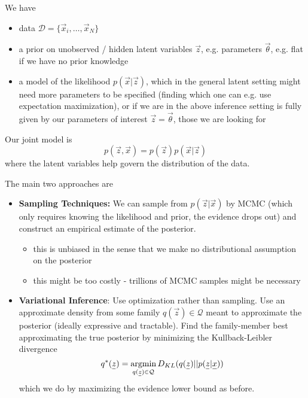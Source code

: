 We have
\begin{itemize}
    \item data $\mathcal{D} = \{ \vec{x}_i, \dots, \vec{x}_N \}$
    \item a prior on unobserved / hidden latent variables $\vec{z}$, e.g. parameters $\vec{\theta}$, e.g. flat if we have no prior knowledge
    \item a model of the likelihood $p(\vec{x}|\vec{z})$, which in the general latent setting might need more parameters
    to be specified (finding which one can e.g. use expectation maximization), or if we are in the above inference setting
    is fully given by our parameters of interest $\vec{z} = \vec{\theta}$, those we are looking for
\end{itemize}

Our joint model is
\begin{equation}
    p(\vec{z},\vec{x}) = p(\vec{z}) p(\vec{x}|\vec{z})
\end{equation}
where the latent variables help govern the distribution of the data.


The main two approaches are
\begin{itemize}
    \item \textbf{Sampling Techniques:} We can sample from $p(\vec{z}|\vec{x})$ by MCMC (which only requires knowing the
    likelihood and prior, the evidence drops out) and construct an empirical estimate of the posterior.
    \begin{itemize}
        \item \textcolor{green1}{this is unbiased in the sense that we make no distributional assumption on the posterior}
        \item \textcolor{red1}{this might be too costly - trillions of MCMC samples might be necessary}
    \end{itemize}
    \item \textbf{Variational Inference}: Use optimization rather than sampling. Use an approximate
    density from some family $q(\vec{z}) \in \mathcal{Q}$ meant to approximate the posterior (ideally expressive and tractable). Find the family-member
    best approximating the true posterior by minimizing the Kullback-Leibler divergence
    \begin{equation}
        q^*(\vec{z}) = \argmin_{q(\vec{z}) \in \mathcal{Q}} D_{KL}(q(\vec{z})||p(\vec{z}|\vec{x}))
    \end{equation}
    which we do by maximizing the evidence lower bound as before.
\end{itemize}


